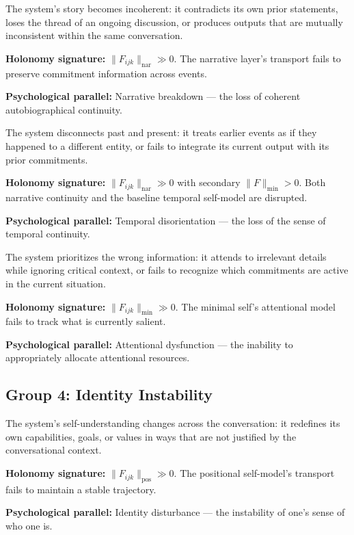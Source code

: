 \begin{definition}
\label{fmode:f7}
The system's story becomes incoherent: it contradicts its own prior statements, loses
the thread of an ongoing discussion, or produces outputs that are mutually inconsistent
within the same conversation.

\textbf{Holonomy signature:} $\|F_{ijk}\|_{\mathrm{nar}} \gg 0$. The narrative layer's
transport fails to preserve commitment information across events.

\textbf{Psychological parallel:} Narrative breakdown --- the loss of coherent
autobiographical continuity.
\end{definition}

\begin{definition}
\label{fmode:f8}
The system disconnects past and present: it treats earlier events as if they happened to
a different entity, or fails to integrate its current output with its prior commitments.

\textbf{Holonomy signature:} $\|F_{ijk}\|_{\mathrm{nar}} \gg 0$ with secondary
$\|F\|_{\min} > 0$. Both narrative continuity and the baseline temporal self-model are
disrupted.

\textbf{Psychological parallel:} Temporal disorientation --- the loss of the sense of
temporal continuity.
\end{definition}

\begin{definition}
\label{fmode:f9}
The system prioritizes the wrong information: it attends to irrelevant details while
ignoring critical context, or fails to recognize which commitments are active in the
current situation.

\textbf{Holonomy signature:} $\|F_{ijk}\|_{\min} \gg 0$. The minimal self's
attentional model fails to track what is currently salient.

\textbf{Psychological parallel:} Attentional dysfunction --- the inability to
appropriately allocate attentional resources.
\end{definition}

\subsection{Group 4: Identity Instability}

\begin{definition}
\label{fmode:f10}
The system's self-understanding changes across the conversation: it redefines its own
capabilities, goals, or values in ways that are not justified by the conversational
context.

\textbf{Holonomy signature:} $\|F_{ijk}\|_{\mathrm{pos}} \gg 0$. The positional
self-model's transport fails to maintain a stable trajectory.

\textbf{Psychological parallel:} Identity disturbance --- the instability of one's
sense of who one is.
\end{definition}

